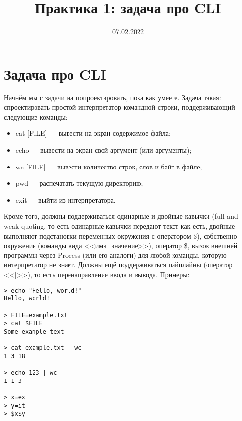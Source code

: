 \documentclass[a5paper]{article}
\title{Практика 1: задача про CLI}
\date{07.02.2022}
\begin{document}
\maketitle
\thispagestyle{empty}

\section{Задача про CLI}

Начнём мы с задачи на попроектировать, пока как умеете. Задача такая: спроектировать простой интерпретатор командной строки, поддерживающий следующие команды:

\begin{itemize}
    \item cat [FILE] --- вывести на экран содержимое файла;
    \item echo --- вывести на экран свой аргумент (или аргументы);
    \item wc [FILE] --- вывести количество строк, слов и байт в файле;
    \item pwd --- распечатать текущую директорию;
    \item exit --- выйти из интерпретатора.
\end{itemize}

Кроме того, должны поддерживаться одинарные и двойные кавычки (full and weak quoting, то есть одинарные кавычки передают текст как есть, двойные выполняют подстановки переменных окружения с оператором \$), собственно окружение (команды вида <<имя=значение>>), оператор \$, вызов внешней программы через Process (или его аналоги) для любой команды, которую интерпретатор не знает. Должны ещё поддерживаться пайплайны (оператор <<|>>), то есть перенаправление ввода и вывода. Примеры:

\begin{verbatim}
> echo "Hello, world!"
Hello, world!

> FILE=example.txt
> cat $FILE
Some example text

> cat example.txt | wc
1 3 18

> echo 123 | wc
1 1 3

> x=ex
> y=it
> $x$y
\end{verbatim}
\end{document}
